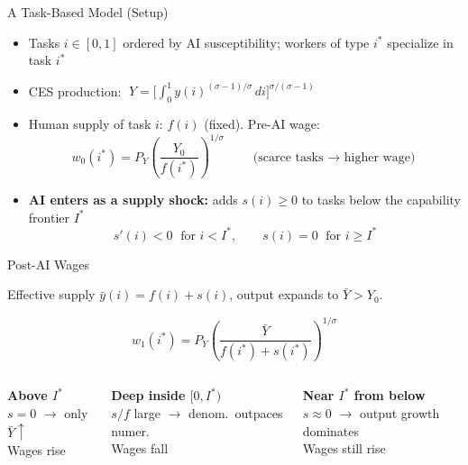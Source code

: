 \documentclass[aspectratio=169]{beamer}
\begin{document}
\begin{frame}{A Task-Based Model (Setup)}

\begin{itemize}
  \item Tasks $i\in[0,1]$ ordered by AI susceptibility;
        workers of type $i^*$ specialize in task $i^*$

  \medskip
  \item CES production:
  $\;Y = \bigl[\int_0^1 y(i)^{(\sigma-1)/\sigma}\,di\bigr]^{\sigma/(\sigma-1)}$

  \medskip
  \item Human supply of task $i$: $f(i)$ (fixed).
        Pre-AI wage:
  \[
    w_0(i^*) = P_Y\!\left(\frac{Y_0}{f(i^*)}\right)^{\!1/\sigma}
    \qquad\text{(scarce tasks $\rightarrow$ higher wage)}
  \]

  \medskip
  \item \textbf{AI enters as a supply shock:} adds $s(i)\geq 0$ to tasks
        below the capability frontier $I^*$
  \[
    s'(i)<0 \;\text{ for }i<I^*,
    \qquad s(i)=0 \;\text{ for }i\geq I^*
  \]
\end{itemize}

\end{frame}

\begin{frame}{Post-AI Wages}

Effective supply $\bar y(i) = f(i)+s(i)$, \quad output expands to $\bar Y > Y_0$.

\[
  \boxed{w_1(i^*) = P_Y\!\left(\frac{\bar Y}{f(i^*)+s(i^*)}\right)^{\!1/\sigma}}
\]

\medskip
\begin{columns}[t]
  \textbf{\textcolor{mygreen}{Above $I^*$}}\\[3pt]
  $s=0$ $\rightarrow$ only $\bar Y\uparrow$\\
  Wages \textcolor{mygreen}{rise}

  \textbf{\textcolor{myred}{Deep inside $[0,I^*)$}}\\[3pt]
  $s/f$ large $\rightarrow$ denom.\ outpaces numer.\\
  Wages \textcolor{myred}{fall}

  \textbf{\textcolor{mygreen}{Near $I^*$ from below}}\\[3pt]
  $s\approx 0$ $\rightarrow$ output growth dominates\\
  Wages still \textcolor{mygreen}{rise}
\end{columns}
\end{frame}
\end{document}
